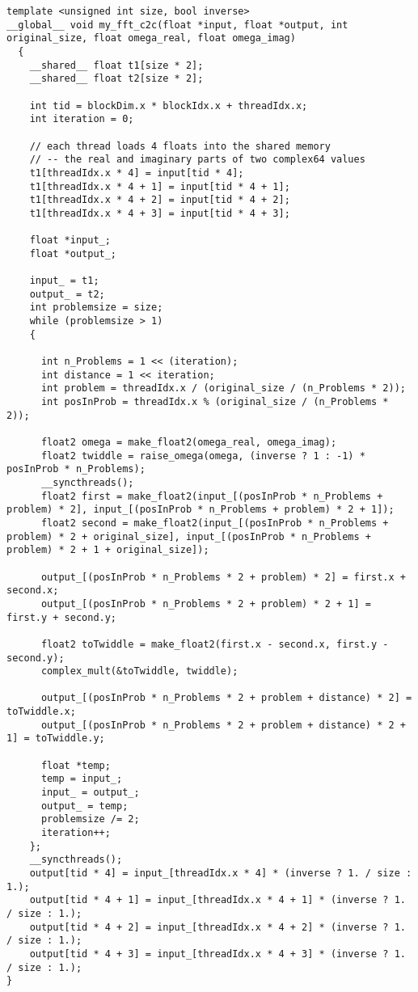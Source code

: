 \documentclass[english,11pt,a4paper,table]{article} %
\begin{document}
\begin{verbatim}
template <unsigned int size, bool inverse>
__global__ void my_fft_c2c(float *input, float *output, int original_size, float omega_real, float omega_imag)
  {
	__shared__ float t1[size * 2];
	__shared__ float t2[size * 2];
	
	int tid = blockDim.x * blockIdx.x + threadIdx.x;
	int iteration = 0;
	
	// each thread loads 4 floats into the shared memory
	// -- the real and imaginary parts of two complex64 values
	t1[threadIdx.x * 4] = input[tid * 4];
	t1[threadIdx.x * 4 + 1] = input[tid * 4 + 1];
	t1[threadIdx.x * 4 + 2] = input[tid * 4 + 2];
	t1[threadIdx.x * 4 + 3] = input[tid * 4 + 3];
	
	float *input_;
	float *output_;
	
	input_ = t1;
	output_ = t2;
	int problemsize = size;
	while (problemsize > 1)
	{
	
	  int n_Problems = 1 << (iteration);
	  int distance = 1 << iteration;
	  int problem = threadIdx.x / (original_size / (n_Problems * 2));
	  int posInProb = threadIdx.x % (original_size / (n_Problems * 2));
	
	  float2 omega = make_float2(omega_real, omega_imag);
	  float2 twiddle = raise_omega(omega, (inverse ? 1 : -1) * posInProb * n_Problems);
	  __syncthreads();
	  float2 first = make_float2(input_[(posInProb * n_Problems + problem) * 2], input_[(posInProb * n_Problems + problem) * 2 + 1]);
	  float2 second = make_float2(input_[(posInProb * n_Problems + problem) * 2 + original_size], input_[(posInProb * n_Problems + problem) * 2 + 1 + original_size]);
	
	  output_[(posInProb * n_Problems * 2 + problem) * 2] = first.x + second.x;
	  output_[(posInProb * n_Problems * 2 + problem) * 2 + 1] = first.y + second.y;
	
	  float2 toTwiddle = make_float2(first.x - second.x, first.y - second.y);
	  complex_mult(&toTwiddle, twiddle);
	
	  output_[(posInProb * n_Problems * 2 + problem + distance) * 2] = toTwiddle.x;
	  output_[(posInProb * n_Problems * 2 + problem + distance) * 2 + 1] = toTwiddle.y;
	
	  float *temp;
	  temp = input_;
	  input_ = output_;
	  output_ = temp;
	  problemsize /= 2;
	  iteration++;
 	};
	__syncthreads();
	output[tid * 4] = input_[threadIdx.x * 4] * (inverse ? 1. / size : 1.);
	output[tid * 4 + 1] = input_[threadIdx.x * 4 + 1] * (inverse ? 1. / size : 1.);
	output[tid * 4 + 2] = input_[threadIdx.x * 4 + 2] * (inverse ? 1. / size : 1.);
	output[tid * 4 + 3] = input_[threadIdx.x * 4 + 3] * (inverse ? 1. / size : 1.);
}
\end{verbatim}
\end{document}
